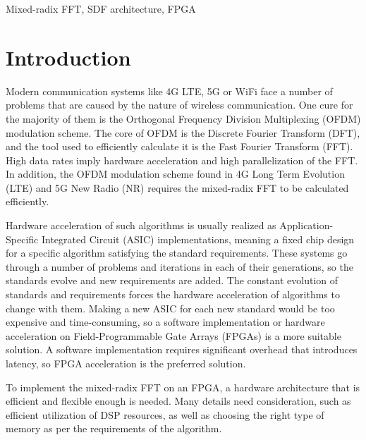 \documentclass[a4paper,12pt, master]{etf}
\begin{document}
\begin{abstract}
In this work, the theoretical background of the mixed-radix Fast Fourier Transform (FFT) algorithm is presented. The necessary algorithms for its implementation are analyzed. A Single-path Delay Feedback (SDF) hardware architecture for the FFT is simulated in software. The hardware implementation of the FFT is realized on a FPGA (Field-Programmable Gate Array) chip.
\end{abstract}

\begin{keywords}
Mixed-radix FFT, SDF architecture, FPGA
\end{keywords}

\tableofcontents

\chapter{Introduction}

Modern communication systems like 4G LTE, 5G or WiFi face a number of problems that are caused by the nature of wireless communication. One cure for the majority of them is the Orthogonal Frequency Division Multiplexing (OFDM) modulation scheme. The core of OFDM is the Discrete Fourier Transform (DFT), and the tool used to efficiently calculate it is the Fast Fourier Transform (FFT). High data rates imply hardware acceleration and high parallelization of the FFT. In addition, the OFDM modulation scheme found in 4G Long Term Evolution (LTE) and 5G New Radio (NR) requires the mixed-radix FFT to be calculated efficiently.

Hardware acceleration of such algorithms is usually realized as Application-Specific Integrated Circuit (ASIC) implementations, meaning a fixed chip design for a specific algorithm satisfying the standard requirements.
These systems go through a number of problems and iterations in each of their generations, so the standards evolve and new requirements are added. The constant evolution of standards and requirements forces the hardware acceleration of algorithms to change with them. Making a new ASIC for each new standard would be too expensive and time-consuming, so a software implementation or hardware acceleration on Field-Programmable Gate Arrays (FPGAs) is a more suitable solution. A software implementation requires significant overhead that introduces latency, so FPGA acceleration is the preferred solution.

To implement the mixed-radix FFT on an FPGA, a hardware architecture that is efficient and flexible enough is needed. Many details need consideration, such as efficient utilization of DSP resources, as well as choosing the right type of memory as per the requirements of the algorithm.
\end{document}
